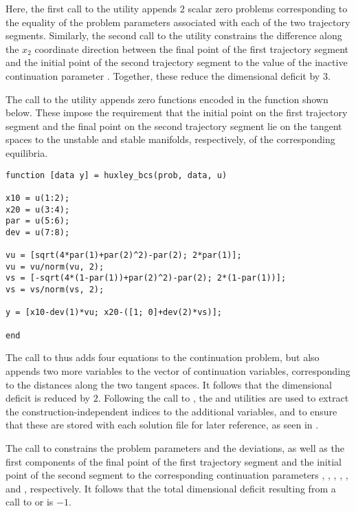 Here, the first call to the  utility appends $2$ scalar zero problems corresponding to the equality of the problem parameters associated with each of the two trajectory segments. Similarly, the second call to the  utility constrains the difference along the $x_2$ coordinate direction between the final point of the first trajectory segment and the initial point of the second trajectory segment to the value of the inactive continuation parameter . Together, these reduce the dimensional deficit by $3$.

The call to the  utility appends zero functions encoded in the function  shown below. These impose the requirement that the initial point on the first trajectory segment and the final point on the second trajectory segment lie on the tangent spaces to the unstable and stable manifolds, respectively, of the corresponding equilibria.
\begin{lstlisting}[language=coco-highlight]
function [data y] = huxley_bcs(prob, data, u)

x10 = u(1:2);
x20 = u(3:4);
par = u(5:6);
dev = u(7:8);

vu = [sqrt(4*par(1)+par(2)^2)-par(2); 2*par(1)];
vu = vu/norm(vu, 2);
vs = [-sqrt(4*(1-par(1))+par(2)^2)-par(2); 2*(1-par(1))];
vs = vs/norm(vs, 2);

y = [x10-dev(1)*vu; x20-([1; 0]+dev(2)*vs)];

end
\end{lstlisting}
The call to  thus adds four equations to the continuation problem, but also appends two more variables to the vector of continuation variables, corresponding to the distances along the two tangent spaces. It follows that the dimensional deficit is reduced by $2$. Following the call to , the  and  utilities are used to extract the construction-independent indices to the additional variables, and to ensure that these are stored with each solution file for later reference, as seen in .

The call to  constrains the problem parameters and the deviations, as well as the first components of the final point of the first trajectory segment and the initial point of the second segment to the corresponding continuation parameters , , , , , and , respectively. It follows that the total dimensional deficit resulting from a call to  or  is $-1$.

